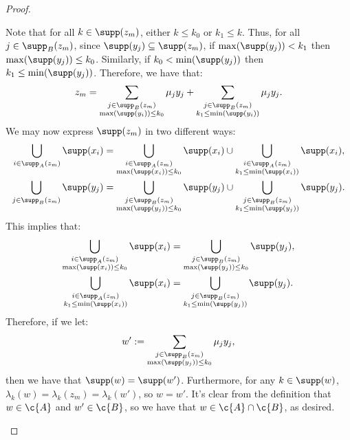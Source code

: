 \documentclass[11pt,reqno]{amsart}
\begin{document}
\begin{proof}
\begin{midproof}
        Note that for all $k \in \supp(z_m)$, either $k \leq k_0$ or $k_1 \leq k$. Thus, for all $j \in \supp_B(z_m)$, since $\supp(y_j) \subseteq \supp(z_m)$, if $\max(\supp(y_j)) < k_1$ then $\max(\supp(y_j)) \leq k_0$. Similarly, if $k_0 < \min(\supp(y_j))$ then $k_1 \leq \min(\supp(y_j))$. Therefore, we have that:
        \begin{align*}
            z_m = \sum_{\substack{j \in \supp_B(z_m) \\ \max(\supp(y_i)) \leq k_0}} \mu_j y_j + \sum_{\substack{j \in \supp_B(z_m) \\ k_1 \leq \min(\supp(y_i))}} \mu_j y_j.
        \end{align*}
        We may now express $\supp(z_m)$ in two different ways:
        \begin{align*}
            \bigcup_{i \in \supp_A(z_m)} \supp(x_i) &= \bigcup_{\substack{i \in \supp_A(z_m) \\ \max(\supp(x_i)) \leq k_0}} \supp(x_i) \cup \bigcup_{\substack{i \in \supp_A(z_m) \\ k_1 \leq \min(\supp(x_i))}} \supp(x_i), \\
            \bigcup_{j \in \supp_B(z_m)} \supp(y_j) &= \bigcup_{\substack{j \in \supp_B(z_m) \\ \max(\supp(y_j)) \leq k_0}} \supp(y_j) \cup \bigcup_{\substack{j \in \supp_B(z_m) \\ k_1 \leq \min(\supp(y_j))}} \supp(y_j).
        \end{align*}
        This implies that:
        \begin{align*}
            \bigcup_{\substack{i \in \supp_A(z_m) \\ \max(\supp(x_i)) \leq k_0}} \supp(x_i) &= \bigcup_{\substack{j \in \supp_B(z_m) \\ \max(\supp(y_j)) \leq k_0}} \supp(y_j), \\
            \bigcup_{\substack{i \in \supp_A(z_m) \\ k_1 \leq \min(\supp(x_i))}} \supp(x_i) &= \bigcup_{\substack{j \in \supp_B(z_m) \\ k_1 \leq \min(\supp(y_j))}} \supp(y_j).
        \end{align*}
        Therefore, if we let:
        \begin{align*}
            w' := \sum_{\substack{j \in \supp_B(z_m) \\ \max(\supp(y_j)) \leq k_0}} \mu_jy_j,
        \end{align*}
        then we have that $\supp(w) = \supp(w')$. Furthermore, for any $k \in \supp(w)$, $\lambda_k(w) = \lambda_k(z_m) = \lambda_k(w')$, so $w = w'$. It's clear from the definition that $w \in \c{A}$ and $w' \in \c{B}$, so we have that $w \in \c{A} \cap \c{B}$, as desired.
    \end{midproof}


\end{proof}
\end{document}

